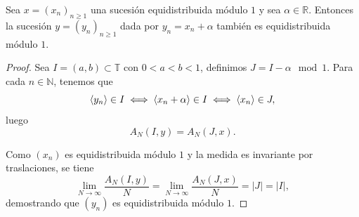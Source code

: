 \begin{proposition}
    \label{prop:secuencia_mas_const}
    Sea $x=(x_n)_{n\geq1}$ una sucesión equidistribuida módulo $1$ y sea $\alpha \in \mathbb{R}$. 
    Entonces la sucesión $y=(y_n)_{n\geq1}$ dada por $y_n = x_n + \alpha$ también es equidistribuida módulo $1$.
\end{proposition}

\begin{proof}
    Sea $I=(a,b) \subset \mathbb{T}$ con $0 < a < b < 1$, definimos $J = I - \alpha \mod 1$.
    Para cada $n \in \mathbb{N}$, tenemos que
    \[
        \langle y_n \rangle \in I
        \iff \langle x_n + \alpha \rangle \in I
        \iff \langle x_n \rangle \in J,
    \]
    luego
    \[
        A_N(I,y)=A_N(J,x).
    \]

    Como $(x_n)$ es equidistribuida módulo $1$ y la medida es invariante por traslaciones, se tiene
    \[
        \lim_{N\to\infty} \frac{A_N(I,y)}{N} =
        \lim_{N\to\infty} \frac{A_N(J,x)}{N} =
        |J|=|I| ,
    \]
    demostrando que $(y_n)$ es equidistribuida módulo $1$.
\end{proof}
